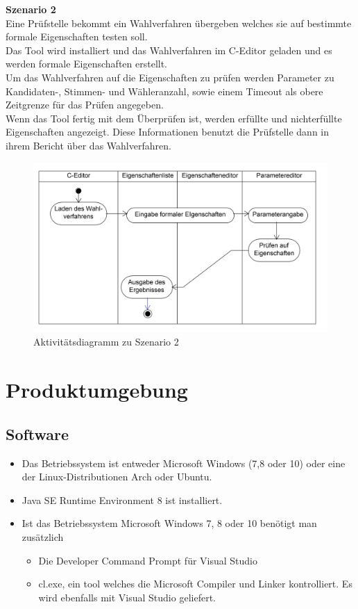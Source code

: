 \documentclass[a4paper]{scrreprt}
\begin{document}
\textbf{Szenario 2}\\
Eine Prüfstelle bekommt ein Wahlverfahren übergeben welches sie auf bestimmte formale Eigenschaften testen soll.\\
Das Tool wird installiert und das Wahlverfahren im C-Editor geladen und es werden formale Eigenschaften erstellt.\\
Um das Wahlverfahren auf die Eigenschaften zu prüfen werden Parameter zu \\Kandidaten-, Stimmen- und Wähleranzahl, sowie einem Timeout als obere Zeitgrenze für das Prüfen angegeben.\\
Wenn das Tool fertig mit dem Überprüfen ist, werden erfüllte und nichterfüllte Eigenschaften angezeigt. Diese Informationen benutzt die Prüfstelle dann in ihrem Bericht über das Wahlverfahren.\\

\begin{figure}[H]
\includegraphics[scale=0.12]{ActivityDiagramScenario2.png}
\caption{Aktivitätsdiagramm zu Szenario 2}
\label{Packet-scetch}
\end{figure}

\chapter{Produktumgebung}

\section{Software}
\begin{itemize}
\item Das Betriebssystem ist entweder Microsoft Windows (7,8 oder 10) oder eine der Linux-Distributionen Arch oder Ubuntu.
\item Java SE Runtime Environment 8 ist installiert.
\item Ist das Betriebssystem Microsoft Windows 7, 8 oder 10 benötigt man zusätzlich
\begin{itemize}
\item Die Developer Command Prompt für Visual Studio
\item cl.exe, ein tool welches die Microsoft Compiler und Linker kontrolliert. Es wird ebenfalls mit Visual Studio geliefert.
\end{itemize}
\end{itemize}
\end{document}
